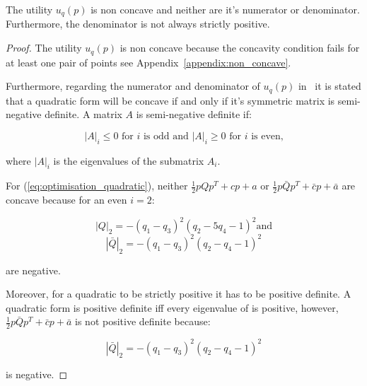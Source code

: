 The utility \(u_q(p)\) is non concave and neither are it's numerator or
denominator. Furthermore, the denominator is not always strictly positive.

\begin{proof}

The utility \(u_q(p)\) is non concave because the concavity condition fails for at
least one pair of points see Appendix~\ref{appendix:non_concave}.

Furthermore, regarding the numerator and denominator of \(u_q(p)\)
in~\cite{Anton2014} it is stated that a quadratic form will be concave if and
only if it's symmetric matrix is semi-negative definite. A matrix \(A\) is
semi-negative definite if:

\begin{equation}\label{def:semi_negative}
|A|_i \leq 0 \text{ for } i \text{ is odd and } |A|_i \geq 0  \text{ for } i
\text{ is even,}
\end{equation}

where \(|A|_i\) is the eigenvalues of the submatrix \(A_i\).

For (\ref{eq:optimisation_quadratic}), neither \(\frac{1}{2}pQp^T + cp + a\)
or \(\frac{1}{2}p\bar{Q}p^T + \bar{c}p + \bar{a}\) are concave because for an even \(i=2\):

\[|Q|_2 = - \left(q_{1} - q_{3}\right)^{2} \left(q_{2} - 5 q_{4} - 1\right)^{2} \text{and}\]
\[|\bar{Q}|_2 =- \left(q_{1} - q_{3}\right)^{2} \left(q_{2} - q_{4} - 1\right)^{2}\]

are negative.

Moreover, for a quadratic to be strictly positive it has to be positive definite.
A quadratic form is positive definite iff every eigenvalue of is positive,
however, \(\frac{1}{2}p\bar{Q}p^T + \bar{c}p + \bar{a}\) is not positive definite
because:

\[|\bar{Q}|_2 =- \left(q_{1} - q_{3}\right)^{2} \left(q_{2} - q_{4} - 1\right)^{2}\]

is negative.
\end{proof}